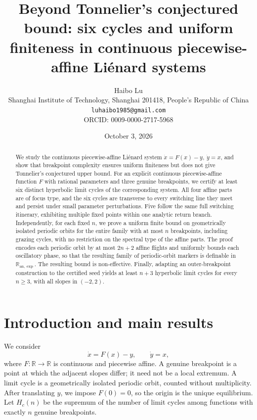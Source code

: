 \documentclass[11pt]{article}
\title{Beyond Tonnelier's conjectured bound: six cycles and uniform finiteness
in continuous piecewise-affine Li\'enard systems}
\author{Haibo Lu\\
Shanghai Institute of Technology, Shanghai 201418, People's Republic of China\\
\texttt{luhaibo1985@gmail.com}\\
ORCID: 0009-0000-2717-5968}
\date{October 3, 2026}
\theoremstyle{remark}
\newcommand{\R}{\mathbb R}
\newcommand{\Ranexp}{\mathbb R_{\mathrm{an},\exp}}
\begin{document}
\maketitle

\begin{abstract}
We study the continuous piecewise-affine Li\'enard system
\(\dot x=F(x)-y,\ \dot y=x\), and show that breakpoint complexity
ensures uniform finiteness but does not give Tonnelier's conjectured
upper bound.  For an explicit continuous piecewise-affine function \(F\)
with rational parameters and three genuine breakpoints, we certify at least
six distinct hyperbolic limit cycles of the corresponding system.
All four affine parts are of
focus type, and the six cycles are transverse to every switching line they
meet and persist under small parameter perturbations.  Five follow the
same full switching itinerary, exhibiting multiple fixed points within
one analytic return branch.  Independently, for each fixed \(n\), we
prove a uniform finite bound on geometrically isolated periodic orbits
for the entire family with at most \(n\) breakpoints, including grazing
cycles, with no restriction on the spectral type of the affine parts.
The proof encodes each periodic orbit
by at most \(2n+2\) affine flights and uniformly bounds each oscillatory
phase, so that the resulting family of periodic-orbit markers is definable
in \(\Ranexp\).
The resulting bound is non-effective.  Finally, adapting an
outer-breakpoint construction to the certified seed yields at least
\(n+3\) hyperbolic limit cycles for every \(n\ge3\), with all slopes
in \((-2,2)\).
\end{abstract}

\section{Introduction and main results}

We consider
\begin{equation}\label{eq:system}
 \dot x=F(x)-y,\qquad \dot y=x,
\end{equation}
where \(F:\R\to\R\) is continuous and piecewise affine.  A genuine
breakpoint is a point at which the adjacent slopes differ; it need not
be a local extremum.  A limit cycle is a geometrically isolated
periodic orbit, counted without multiplicity.  After translating \(y\),
we impose \(F(0)=0\), so the origin is the unique equilibrium.  Let
\(H_c(n)\) be the supremum of the number of
limit cycles among functions with exactly \(n\) genuine breakpoints.
\end{document}
